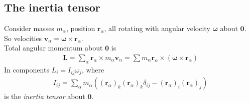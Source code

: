 \documentclass[a4paper]{article}
\begin{document}
\subsection{The inertia tensor}
Consider masses $m_\alpha$, position $\mathbf{r}_\alpha$, all rotating with angular velocity $\mathbf{\omega}$ about $\mathbf{0}$.\\
So velocities $\mathbf{v}_\alpha = \mathbf{\omega} \times \mathbf{r}_\alpha$.\\
Total angular momentum about $\mathbf{0}$ is
\begin{equation*}
\begin{aligned}
\mathbf{L} = \sum_\alpha \mathbf{r}_\alpha \times m_\alpha \mathbf{v}_\alpha = \sum m_\alpha \mathbf{r}_\alpha \times \left(\mathbf{\omega} \times \mathbf{r}_\alpha\right)
\end{aligned}
\end{equation*}
In components $L_i = I_{ij} \omega_j$, where
\begin{equation*}
\begin{aligned}
I_{ij} = \sum_\alpha m_\alpha \left(\left(\mathbf{r}_\alpha\right)_k \left(\mathbf{r}_\alpha\right)_k \delta_{ij} - \left(\mathbf{r}_\alpha\right)_i \left(\mathbf{r}_\alpha\right)_j\right)
\end{aligned}
\end{equation*}
is the \emph{inertia tensor} about $\mathbf{0}$.
\end{document}
